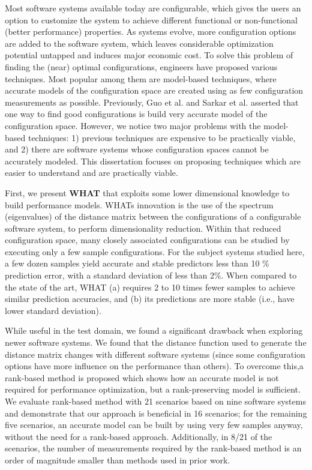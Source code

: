 Most software systems available today are configurable, which gives the users an option to customize the system to achieve different functional or non-functional (better performance) properties. As systems evolve, more configuration options are added to the
software system, which leaves considerable
optimization potential untapped and induces major economic cost.
To solve this problem of finding the (near) optimal configurations,
engineers have proposed various techniques. Most popular among
them are model-based techniques, where accurate models of the configuration space are created using as few configuration measurements as possible. Previously, Guo et al. and Sarkar et al. asserted that one way to find good configurations is build very accurate model of the configuration space. However, we notice two major problems with the model-based techniques: 1) previous techniques are expensive to be practically viable, and 2) there are software systems whose configuration spaces cannot be accurately modeled. 
This dissertation focuses on proposing techniques which are
easier to understand and are practically viable. 

First, we present \textbf{WHAT} that exploits
some lower dimensional knowledge to build performance models. 
WHAT\textquotesingle s innovation
is the use of the spectrum (eigenvalues) of the distance matrix between the
configurations of a configurable software system, to perform dimensionality reduction.
Within that reduced configuration space, many closely associated configurations
can be studied by executing only a few sample configurations. For the subject systems
studied here, a few dozen samples yield accurate and stable predictors less than
10 \% prediction error, with a standard deviation of less than 2\%. When compared
to the state of the art, WHAT (a) requires 2 to 10 times fewer samples to achieve
similar prediction accuracies, and (b) its predictions are more stable (i.e., have lower
standard deviation). 

While useful in the test domain, we found a significant drawback when exploring newer software systems. We found that the distance function used to generate the distance matrix changes with different software systems (since some configuration options have more influence on the performance than others). To overcome this,a rank-based method is proposed
which shows how an accurate model is not required for performance optimization, but a rank-preserving model is sufficient. We evaluate rank-based method with 21 scenarios based on nine software systems and demonstrate that our approach is beneficial in 16 scenarios; for the remaining five scenarios, an accurate model
can be built by using very few samples anyway, without the need
for a rank-based approach. Additionally, in 8/21 of the scenarios,
the number of measurements required by the rank-based method
is an order of magnitude smaller than methods used in prior work.

